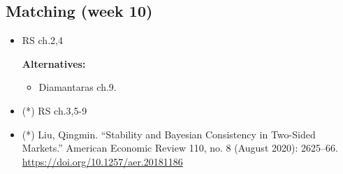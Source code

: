 \documentclass{article}
\begin{document}
\subsection{Matching (week 10)}
\begin{itemize}
	\item RS ch.2,4
	
	\textbf{Alternatives:}
	\begin{itemize}
		\item Diamantaras ch.9.
	\end{itemize}
	\item (*) RS ch.3,5-9
	\item (*) Liu, Qingmin. ``Stability and Bayesian Consistency in Two-Sided Markets.'' American Economic Review 110, no. 8 (August 2020): 2625–66. \url{https://doi.org/10.1257/aer.20181186}
\end{itemize}
\end{document}
